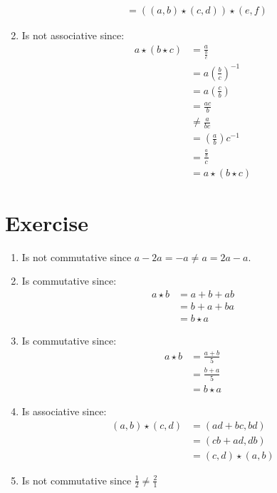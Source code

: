 \documentclass{article}
\begin{document}
\begin{enumerate}[label=(\alph*)]
\begin{align*}
        &= ((a, b) \star (c, d)) \star (e, f)
    \end{align*}
    \item Is not associative since:
    \begin{align*}
        a \star (b \star c) &= \frac{a}{\frac{b}{c}} \\
        &= a \left(\frac{b}{c}\right)^{-1} \\
        &= a \left(\frac{c}{b}\right) \\
        &= \frac{ac}{b} \\
        &\neq \frac{a}{bc} \\
        &= \left(\frac{a}{b}\right) c^{-1} \\
        &= \frac{\frac{a}{b}}{c} \\
        &= a \star (b \star c)
    \end{align*}
\end{enumerate}
\section{Exercise}
\begin{enumerate}[label=(\alph*)]
    \item Is not commutative since $a - 2a = -a \neq a = 2a - a$.
    \item Is commutative since:
    \begin{align*}
        a \star b &= a + b + ab \\
        &= b + a + ba \\
        &= b \star a
    \end{align*}
    \item Is commutative since:
    \begin{align*}
        a \star b &= \frac{a + b}{5} \\
        &= \frac{b + a}{5} \\
        &= b \star a
    \end{align*}
    \item Is associative since:
    \begin{align*}
        (a, b) \star (c, d) &= (ad + bc, bd) \\
        &= (cb + ad, db) \\
        &= (c, d) \star (a, b) 
    \end{align*}
    \item Is not commutative since $\frac{1}{2} \neq \frac{2}{1}$
\end{enumerate}
\end{document}
